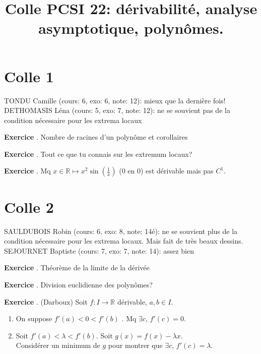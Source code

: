 \documentclass[10pt,a4paper]{article}
\title{Colle PCSI 22: dérivabilité, analyse asymptotique, polynômes.}
\newcounter{question}
\newcounter{exo}
\newenvironment{exo}{\vspace{0.5cm}\setcounter{question}{0}\addtocounter{exo}{1} \noindent \textbf{Exercice \theexo}. \normalsize }{\par}
\begin{document}
	\maketitle
	
	
	\section*{Colle 1}
	\setcounter{exo}{0}
	TONDU Camille (cours: 6, exo: 6, note: 12): mieux que la dernière fois! \\
	DETHOMASIS Léna (cours: 5, exo: 7, note: 12): ne se souvient pas de la condition nécessaire pour les extrema locaux\\
	
	\begin{exo}
		Nombre de racines d'un polynôme et corollaires
	\end{exo}

	\begin{exo}
		Tout ce que tu connais sur les extremum locaux?
	\end{exo}
	
	\begin{exo}
		Mq $x \in \mathbb{R} \longmapsto x^2 \sin(\frac{1}{x})$ (0 en 0) est dérivable mais pas $C^1$. 
	\end{exo}	
	
	\section*{Colle 2}
	\setcounter{exo}{0}
	SAULDUBOIS Robin (cours: 6, exo: 8, note: 14é): ne se souvient plus de la condition nécessaire pour les extrema locaux. Mais fait de très beaux dessins.\\
	SEJOURNET Baptiste (cours: 7, exo: 7, note: 14): assez bien\\	
		
	\begin{exo}
		Théorème de la limite de la dérivée
	\end{exo}		

	\begin{exo}
		Division euclidienne des polynômes?
	\end{exo}

	\begin{exo}
		(Darboux) Soit $f : I \longrightarrow \mathbb{R}$ dérivable, $a, b \in I$.\\
		
		\begin{enumerate}
			\item On suppose $f'(a) < 0 < f'(b)$ . Mq $\exists c$, $f'(c) = 0$.
			\item Soit $f'(a) <  \lambda < f'(b)$. Soit $g(x) = f(x) - \lambda x$.\\
			Considérer un minimum de $g$ pour montrer que $\exists c$, $f'(c) = \lambda$.  
		\end{enumerate}	
	\end{exo}
\end{document}
